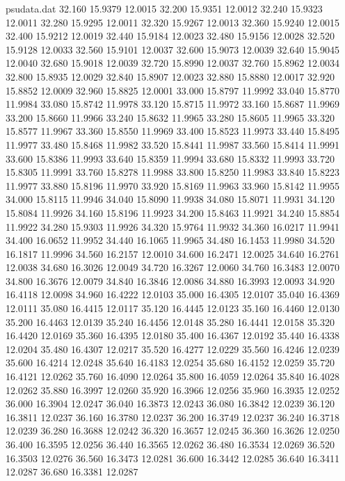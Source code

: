 \begin{filecontents*}{psudata.dat}
32.160 15.9379 12.0015
32.200 15.9351 12.0012
32.240 15.9323 12.0011
32.280 15.9295 12.0011
32.320 15.9267 12.0013
32.360 15.9240 12.0015
32.400 15.9212 12.0019
32.440 15.9184 12.0023
32.480 15.9156 12.0028
32.520 15.9128 12.0033
32.560 15.9101 12.0037
32.600 15.9073 12.0039
32.640 15.9045 12.0040
32.680 15.9018 12.0039
32.720 15.8990 12.0037
32.760 15.8962 12.0034
32.800 15.8935 12.0029
32.840 15.8907 12.0023
32.880 15.8880 12.0017
32.920 15.8852 12.0009
32.960 15.8825 12.0001
33.000 15.8797 11.9992
33.040 15.8770 11.9984
33.080 15.8742 11.9978
33.120 15.8715 11.9972
33.160 15.8687 11.9969
33.200 15.8660 11.9966
33.240 15.8632 11.9965
33.280 15.8605 11.9965
33.320 15.8577 11.9967
33.360 15.8550 11.9969
33.400 15.8523 11.9973
33.440 15.8495 11.9977
33.480 15.8468 11.9982
33.520 15.8441 11.9987
33.560 15.8414 11.9991
33.600 15.8386 11.9993
33.640 15.8359 11.9994
33.680 15.8332 11.9993
33.720 15.8305 11.9991
33.760 15.8278 11.9988
33.800 15.8250 11.9983
33.840 15.8223 11.9977
33.880 15.8196 11.9970
33.920 15.8169 11.9963
33.960 15.8142 11.9955
34.000 15.8115 11.9946
34.040 15.8090 11.9938
34.080 15.8071 11.9931
34.120 15.8084 11.9926
34.160 15.8196 11.9923
34.200 15.8463 11.9921
34.240 15.8854 11.9922
34.280 15.9303 11.9926
34.320 15.9764 11.9932
34.360 16.0217 11.9941
34.400 16.0652 11.9952
34.440 16.1065 11.9965
34.480 16.1453 11.9980
34.520 16.1817 11.9996
34.560 16.2157 12.0010
34.600 16.2471 12.0025
34.640 16.2761 12.0038
34.680 16.3026 12.0049
34.720 16.3267 12.0060
34.760 16.3483 12.0070
34.800 16.3676 12.0079
34.840 16.3846 12.0086
34.880 16.3993 12.0093
34.920 16.4118 12.0098
34.960 16.4222 12.0103
35.000 16.4305 12.0107
35.040 16.4369 12.0111
35.080 16.4415 12.0117
35.120 16.4445 12.0123
35.160 16.4460 12.0130
35.200 16.4463 12.0139
35.240 16.4456 12.0148
35.280 16.4441 12.0158
35.320 16.4420 12.0169
35.360 16.4395 12.0180
35.400 16.4367 12.0192
35.440 16.4338 12.0204
35.480 16.4307 12.0217
35.520 16.4277 12.0229
35.560 16.4246 12.0239
35.600 16.4214 12.0248
35.640 16.4183 12.0254
35.680 16.4152 12.0259
35.720 16.4121 12.0262
35.760 16.4090 12.0264
35.800 16.4059 12.0264
35.840 16.4028 12.0262
35.880 16.3997 12.0260
35.920 16.3966 12.0256
35.960 16.3935 12.0252
36.000 16.3904 12.0247
36.040 16.3873 12.0243
36.080 16.3842 12.0239
36.120 16.3811 12.0237
36.160 16.3780 12.0237
36.200 16.3749 12.0237
36.240 16.3718 12.0239
36.280 16.3688 12.0242
36.320 16.3657 12.0245
36.360 16.3626 12.0250
36.400 16.3595 12.0256
36.440 16.3565 12.0262
36.480 16.3534 12.0269
36.520 16.3503 12.0276
36.560 16.3473 12.0281
36.600 16.3442 12.0285
36.640 16.3411 12.0287
36.680 16.3381 12.0287

\end{filecontents*}
